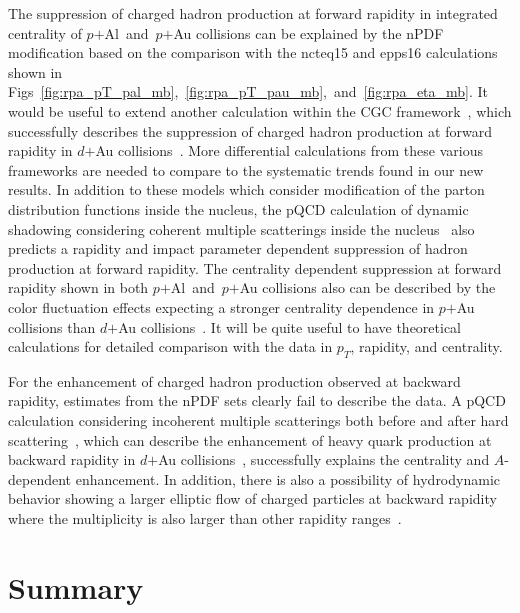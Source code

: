 \documentclass[twocolumn,letterpaper,aps,prc,longbibliography,superscriptaddress,nofootinbib,floatfix]{revtex4-2}
\newcommand{\pt}{\mbox{$p_T$}\xspace}
\newcommand{\dau}{\mbox{$d$$+$Au}\xspace}
\newcommand{\pau}{\mbox{$p$$+$Au}\xspace}
\newcommand{\palau}{\mbox{$p$$+$Al and $p$$+$Au}\xspace}
\newcommand{\ncteq}{\mbox{n{\sc cteq15}}\xspace}
\newcommand{\epps}{\mbox{{\sc epps16}}\xspace}
\begin{document}
The suppression of charged hadron production at forward rapidity in 
integrated centrality of \palau collisions can be explained by the nPDF 
modification based on the comparison with the \ncteq and \epps 
calculations shown in 
Figs~\ref{fig:rpa_pT_pal_mb},~\ref{fig:rpa_pT_pau_mb},~and~\ref{fig:rpa_eta_mb}.  
It would be useful to extend another calculation within the CGC 
framework~\cite{Albacete:2010bs}, which successfully describes the 
suppression of charged hadron production at forward rapidity in \dau 
collisions~\cite{Arsene:2004ux,Adams:2006uz}. More differential 
calculations from these various frameworks are needed to compare to the 
systematic trends found in our new results. In addition to these models 
which consider modification of the parton distribution functions inside 
the nucleus, the pQCD calculation of dynamic shadowing considering 
coherent multiple scatterings inside the nucleus~\cite{Qiu:2004da} also 
predicts a rapidity and impact parameter dependent suppression of hadron 
production at forward rapidity. The centrality dependent suppression at 
forward rapidity shown in both \palau collisions also can be described 
by the color fluctuation effects expecting a stronger centrality 
dependence in \pau collisions than \dau 
collisions~\cite{Alvioli:2017wou}. It will be quite useful to have 
theoretical calculations for detailed comparison with the data in \pt, 
rapidity, and centrality.

For the enhancement of charged hadron production observed at backward 
rapidity, estimates from the nPDF sets clearly fail to describe the 
data. A pQCD calculation considering incoherent multiple scatterings 
both before and after hard scattering~\cite{Kang:2014hha}, which can 
describe the enhancement of heavy quark production at backward rapidity 
in \dau collisions~\cite{Adare:2013lkk}, successfully explains the 
centrality and $A$-dependent enhancement. In addition, there is also a 
possibility of hydrodynamic behavior showing a larger elliptic flow of 
charged particles at backward rapidity where the multiplicity is also 
larger than other rapidity ranges~\cite{Adare:2018toe}.

\section{Summary}
\label{sec:summary}
\end{document}
